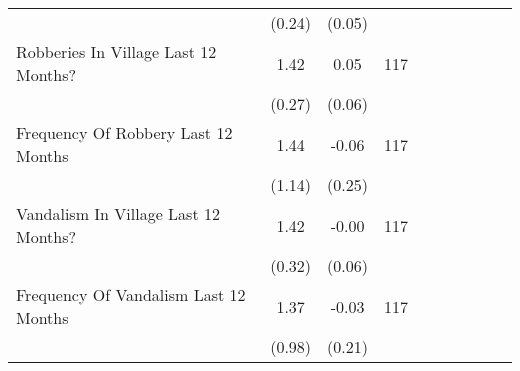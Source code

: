 {\begin{tabular}{l*{3}{SSc}}
          &   (0.24)&   (0.05)&         \\
Robberies In Village Last 12 Months?&     1.42&     0.05&      117\\
          &   (0.27)&   (0.06)&         \\
Frequency Of Robbery Last 12 Months&     1.44&    -0.06&      117\\
          &   (1.14)&   (0.25)&         \\
Vandalism In Village Last 12 Months?&     1.42&    -0.00&      117\\
          &   (0.32)&   (0.06)&         \\
Frequency Of Vandalism Last 12 Months&     1.37&    -0.03&      117\\
          &   (0.98)&   (0.21)&         \\
\bottomrule
\end{tabular}
}
